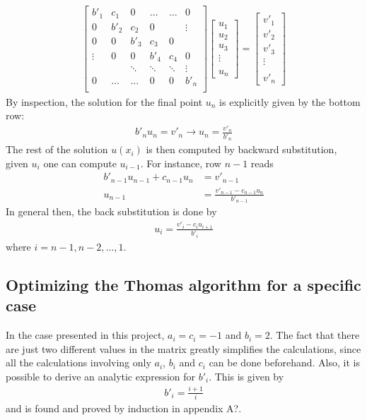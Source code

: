 \documentclass[a4paper,11pt, english, twoside]{article}
\begin{document}
\begin{align*}
  \begin{bmatrix}
    b'_1 & c_1 & 0  & \hdots & \hdots &   0    \\
    0 & b'_2 & c_2 & 0      & &\vdots \\
    0 & 0 & b'_3  & c_3     & 0 &  \\
    \vdots & 0 & 0  & b'_4     & c_4 & 0 \\
    & & \ddots & \ddots & \ddots & \vdots\\
    0 & \hdots  &\hdots & 0 &0 & b'_n \\
  \end{bmatrix}
  \begin{bmatrix}
    u_1 \\ u_2 \\ u_3 \\ \vdots \\ \\ u_n
  \end{bmatrix}
  =
  \begin{bmatrix}
    v'_1 \\ v'_2 \\ v'_3 \\ \vdots \\ \\ v'_n
  \end{bmatrix}
\end{align*}
By inspection, the solution for the final point $u_n$ is explicitly given by the
bottom row:
\begin{align*}
  b'_n u_n = v'_n \rightarrow u_n = \frac{v'_n}{b'_n}
\end{align*}
The rest of the solution $u(x_i)$ is then computed by backward substitution, given
$u_i$ one can compute $u_{i-1}$. For instance, row $n-1$ reads
\begin{align*}
  b'_{n-1} u_{n-1} + c_{n-1} u_n &= v'_{n-1} \\
  u_{n-1} &= \frac{v'_{n-1} - c_{n-1} u_n}{b'_{n-1}}
\end{align*}
In general then, the back substitution is done by
\begin{align*}
  u_i = \frac{v'_i - c_i u_{i+1}}{b'_i}
\end{align*}
where $i = n-1, n-2, \hdots, 1$.
\subsection{Optimizing the Thomas algorithm for a specific case}
In the case presented in this project, $a_i = c_i = -1$ and $b_i = 2$. The fact
that there are just two different values in the matrix greatly simplifies the
calculations, since all the calculations involving only $a_i$, $b_i$ and $c_i$
can be done beforehand. Also, it is possible to derive an analytic expression for
$b'_i$. This is given by
\begin{align*}
  b'_i = \frac{i+1}{i}
\end{align*}
and is found and proved by induction in appendix A?.
\end{document}
